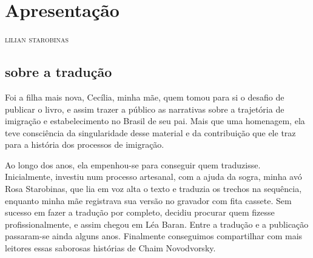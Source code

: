 \newcommand{\subtitulo}[1]{\NoCaseChange{\textnormal{\break\Large\itshape#1}}}
\chapter*{Apresentação\smallskip\subtitulo{Um \emph{road movie} em forma\\de narrativa}}


\begin{flushright}
\textsc{lilian starobinas}
\end{flushright}\medskip

\noindent{}

\section{sobre a tradução}

Foi a filha mais nova, Cecília, minha mãe, quem tomou para si o desafio
de publicar o livro, e assim trazer a público as narrativas sobre a
trajetória de imigração e estabelecimento no Brasil de seu pai. Mais que
uma homenagem, ela teve consciência da singularidade desse material e da
contribuição que ele traz para a história dos processos de imigração.

Ao longo dos anos, ela empenhou-se para conseguir quem traduzisse.
Inicialmente, investiu num processo artesanal, com a ajuda da sogra,
minha avó Rosa Starobinas, que lia em voz alta o texto e traduzia os
trechos na sequência, enquanto minha mãe registrava sua versão no
gravador com fita cassete. Sem sucesso em fazer a tradução por completo,
decidiu procurar quem fizesse profissionalmente, e assim chegou em Léa
Baran. Entre a tradução e a publicação passaram-se ainda alguns anos.
Finalmente conseguimos compartilhar com mais leitores essas saborosas
histórias de Chaim Novodvorsky.

